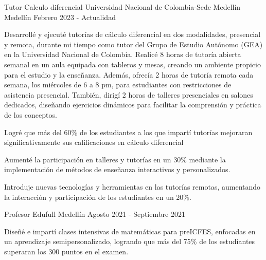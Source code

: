 \newcommand{\quotes}[1]{``#1''}

\begin{cventries}

\cventry
{Tutor Calculo diferencial} %
{Universidad Nacional de Colombia-Sede Medellín} %
{Medellín} %
{Febrero 2023 - Actualidad} %
{
  \begin{cvitems} %
    \item {Desarrollé y ejecuté tutorías de cálculo diferencial en dos modalidades, presencial y remota, durante mi tiempo como tutor
    del Grupo de Estudio Autónomo (GEA) en la Universidad Nacional de Colombia. Realicé 8 horas de tutoría abierta semanal
    en un aula equipada con tableros y mesas, creando un ambiente propicio para el estudio y la enseñanza. Además, ofrecía 2
    horas de tutoría remota cada semana, los miércoles de 6 a 8 pm, para estudiantes con restricciones de asistencia
    presencial. También, dirigí 2 horas de talleres presenciales en salones dedicados, diseñando ejercicios dinámicos para
    facilitar la comprensión y práctica de los conceptos.}
    \item {Logré que más del 60\% de los estudiantes a los que impartí tutorías mejoraran significativamente sus calificaciones en
    cálculo diferencial}
    \item {Aumenté la participación en talleres y tutorías en un 30\% mediante la implementación de métodos de enseñanza
    interactivos y personalizados.}
    \item {Introduje nuevas tecnologías y herramientas en las tutorías remotas, aumentando la interacción y participación de los
    estudiantes en un 20\%.}
  \end{cvitems}
}
\cventry
{Profesor} %
{Edufull} %
{Medellín} %
{Agosto 2021 - Septiembre 2021} %
{
  \begin{cvitems} %
    \item {Diseñé e impartí clases intensivas de matemáticas para preICFES, enfocadas en un aprendizaje semipersonalizado, logrando que más del 75\% de los estudiantes superaran los 300 puntos en el examen.}

\end{cvitems}}
\end{cventries}
